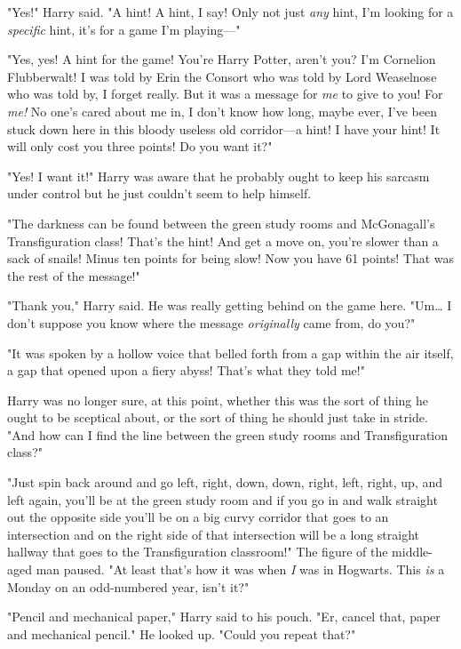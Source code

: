 "Yes!" Harry said. "A hint! A hint, I say! Only not just \emph{any} hint, I'm
looking for a \emph{specific} hint, it's for a game I'm playing---"

"Yes, yes! A hint for the game! You're Harry Potter, aren't you? I'm Cornelion
Flubberwalt! I was told by Erin the Consort who was told by Lord Weaselnose who
was told by, I forget really. But it was a message for \emph{me} to give to
you! For \emph{me!} No one's cared about me in, I don't know how long, maybe
ever, I've been stuck down here in this bloody useless old corridor---a hint! I
have your hint! It will only cost you three points! Do you want it?"

"Yes! I want it!" Harry was aware that he probably ought to keep his sarcasm
under control but he just couldn't seem to help himself.

"The darkness can be found between the green study rooms and McGonagall's
Transfiguration class! That's the hint! And get a move on, you're slower than a
sack of snails! Minus ten points for being slow! Now you have 61 points! That
was the rest of the message!"

"Thank you," Harry said. He was really getting behind on the game here.
"Um{\ldots} I don't suppose you know where the message \emph{originally} came
from, do you?"

"It was spoken by a hollow voice that belled forth from a gap within the air
itself, a gap that opened upon a fiery abyss! That's what they told me!"

Harry was no longer sure, at this point, whether this was the sort of thing he
ought to be sceptical about, or the sort of thing he should just take in
stride. "And how can I find the line between the green study rooms and
Transfiguration class?"

"Just spin back around and go left, right, down, down, right, left, right, up,
and left again, you'll be at the green study room and if you go in and walk
straight out the opposite side you'll be on a big curvy corridor that goes to
an intersection and on the right side of that intersection will be a long
straight hallway that goes to the Transfiguration classroom!" The figure of the
middle-aged man paused. "At least that's how it was when \emph{I} was in
Hogwarts. This \emph{is} a Monday on an odd-numbered year, isn't it?"

"Pencil and mechanical paper," Harry said to his pouch. "Er, cancel that, paper
and mechanical pencil." He looked up. "Could you repeat that?"

